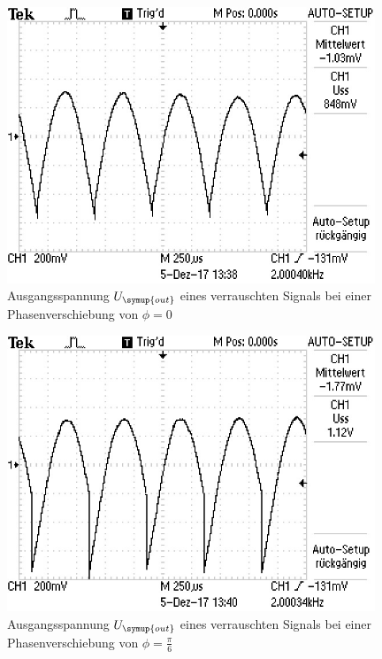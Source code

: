 \begin{figure}
  \centering
  \includegraphics[width=11cm]{data/rauschen_0.jpg}
  \caption{Ausgangsspannung $U_{\symup{out}}$ eines verrauschten Signals bei einer Phasenverschiebung
  von $\phi=0$}
  \label{fig:rauschen_0}
\end{figure}

\begin{figure}
  \centering
  \includegraphics[width=11cm]{data/rauschen_30.jpg}
  \caption{Ausgangsspannung $U_{\symup{out}}$ eines verrauschten Signals bei einer Phasenverschiebung
  von $\phi=\frac{\pi}{6}$}
  \label{fig:phase_30}
\end{figure}

